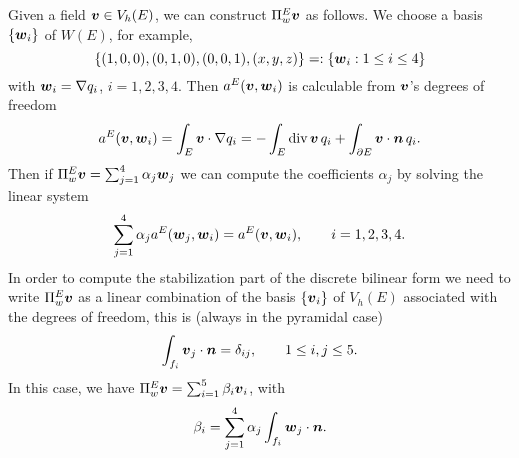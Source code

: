 Given a field $\boldsymbol{v} \in V_h(E)$, we can construct $\Pi_w^E\boldsymbol{v}$
as follows. We choose a basis $\{\boldsymbol{w}_i\}$ of $W(E)$, for
example,
\[
\left\{ (1,0,0), (0,1,0), (0,0,1), (x,y,z) \right\} =: \{
\boldsymbol{w}_i: 1\le i\le4\}
\]
with $\boldsymbol{w}_i=\nabla q_i$, $i=1,2,3,4$. Then $a^E(\boldsymbol{v},\boldsymbol{w}_i)$ is calculable from $\boldsymbol{v}$'s degrees of freedom
\[
a^E(\boldsymbol{v},\boldsymbol{w}_i) = \int_E\boldsymbol{v}\cdot\nabla q_i =
-\int_E\mbox{div\,}\boldsymbol{v}\,q_i + \int_{\partial E}\boldsymbol{v}\cdot\boldsymbol{n}\,q_i.
\]
Then if $\Pi_w^E\boldsymbol{v}=\sum_{j=1}^4\alpha_j\boldsymbol{w}_j$ we can
compute the coefficients $\alpha_j$ by solving the linear system
\[
\sum_{j=1}^4\alpha_j a^E(\boldsymbol{w}_j,\boldsymbol{w}_i) =
a^E(\boldsymbol{v},\boldsymbol{w}_i), \qquad i=1,2,3,4.
\]
In order to compute the stabilization part of the discrete
bilinear form we need to write $\Pi_w^E\boldsymbol{v}$ as a linear
combination of the basis $\{\boldsymbol{v}_i\}$ of $V_h(E)$ associated with
the degrees of freedom, this is (always in the pyramidal case)
\[
\int_{f_i}\boldsymbol{v}_j\cdot\boldsymbol{n} =\delta_{ij}, \qquad 1\le i,j\le 5.
\]
In this case, we have $\Pi_w^E\boldsymbol{v} = \sum_{i=1}^5\beta_i\boldsymbol{v}_i$,
with
\[
\beta_i=\sum_{j=1}^4\alpha_j\int_{f_i}\boldsymbol{w}_j\cdot\boldsymbol{n}.
\]